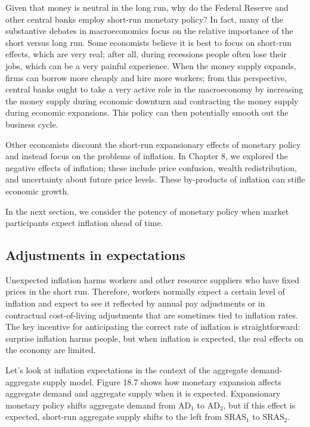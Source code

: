 \documentclass[11pt]{article} %
\begin{document}
Given that money is neutral in the long run, why do the Federal Reserve and other central banks employ short-run monetary policy? In fact, many of the substantive debates in macroeconomics focus on the relative importance of the short versus long run. Some economists believe it is best to focus on short-run effects, which are very real; after all, during recessions people often lose their jobs, which can be a very painful experience. When the money supply expands, firms can borrow more cheaply and hire more workers; from this perspective, central banks ought to take a very active role in the macroeconomy by increasing the money supply during economic downturn and contracting the money supply during economic expansions. This policy can then potentially smooth out the business cycle.

Other economists discount the short-run expansionary effects of monetary policy and instead focus on the problems of inflation. In Chapter 8, we explored the negative effects of inflation; these include price confusion, wealth redistribution, and uncertainty about future price levels. These by-products of inflation can stifle economic growth.

In the next section, we consider the potency of monetary policy when market participants expect inflation ahead of time.

\subsection*{Adjustments in expectations}
Unexpected inflation harms workers and other resource suppliers who have fixed prices in the short run. Therefore, workers normally expect a certain level of inflation and expect to see it reflected by annual pay adjustments or in contractual cost-of-living adjustments that are sometimes tied to inflation rates. The key incentive for anticipating the correct rate of inflation is straightforward: surprise inflation harms people, but when inflation is expected, the real effects on the economy are limited.

Let's look at inflation expectations in the context of the aggregate demand-aggregate supply model. Figure 18.7 shows how monetary expansion affects aggregate demand and aggregate supply when it is expected. Expansionary monetary policy shifts aggregate demand from $\text{AD}_1$ to $\text{AD}_2$, but if this effect is expected, short-run aggregate supply shifts to the left from $\text{SRAS}_1$ to $\text{SRAS}_2$.
\end{document}
